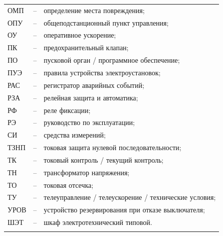 \begin{longtable}{>{\raggedright\arraybackslash}m{2cm}>{\raggedright\arraybackslash}m{0.5cm}>{\raggedright\arraybackslash}m{20cm}}
ОМП & -- & определение места повреждения; \\
ОПУ & -- & общеподстанционный пункт управления; \\
ОУ & -- & оперативное ускорение; \\
ПК & -- & предохранительный клапан; \\
ПО & -- & пусковой орган / программное обеспечение; \\
ПУЭ & -- & правила устройства электроустановок; \\
РАС & -- & регистратор аварийных событий; \\
РЗА & -- & релейная защита и автоматика; \\
РФ & -- & реле фиксации; \\
РЭ & -- & руководство по эксплуатации; \\
СИ & -- & средства измерений; \\
ТЗНП & -- & токовая защита нулевой последовательности; \\
ТК & -- & токовый контроль / текущий контроль; \\
ТН & -- & трансформатор напряжения; \\
ТО & -- & токовая отсечка; \\
ТУ & -- & телеуправление / телеускорение / технические условия; \\
УРОВ & -- & устройство резервирования при отказе выключателя; \\
ШЭТ & -- & шкаф электротехнический типовой. \\
{\color{white}\fontsize{0.1pt}{0.1pt}\selectfont<endABBRS>}
\end{longtable}
